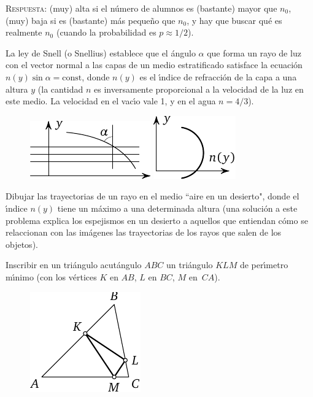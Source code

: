 \documentclass[12pt]{article}  %
\begin{document}
\medskip
\textsc{Respuesta:} (muy) alta si el n\'umero de alumnos es (bastante) mayor que $n_0$,
(muy) baja si es (bastante) m\'as peque\~no que $n_0$, y hay que buscar qu\'e es realmente $n_0$ (cuando la probabilidad es $p \approx 1/2$).

\bigskip
{} La ley de Snell (o Snellius) establece que el \'angulo $\alpha$ que forma un rayo de luz con el vector normal a las capas de un medio estratificado satisface la ecuaci\'on $n(y) \sin \alpha=\text{const}$,
donde $n(y)$ es el \'{\i}ndice de refracci\'on de la capa a una altura $y$ (la cantidad $n$ es 
inversamente proporcional a la velocidad 
de la luz en este medio. La velocidad en el vac\'{\i}o vale 1, y en el agua $n=4/3$).
\begin{figure}[h]
\centering
\includegraphics{taskbook-47}\hskip2cm
\includegraphics{taskbook-471}
\end{figure}

Dibujar las trayectorias de un rayo en el medio ``aire en un desierto", donde el \'{\i}ndice $n(y)$ tiene un m\'aximo 
a una determinada altura
(una soluci\'on a este problema explica los espejismos en un desierto a aquellos que entiendan c\'omo se relaccionan con las im\'agenes las trayectorias de los rayos que salen de los objetos).

\bigskip
{} Inscribir en un tri\'angulo acut\'angulo $ABC$ un tri\'angulo $KLM$ de per\'{\i}metro m\'{\i}nimo
(con los v\'ertices $K$ en $AB$, $L$ en $BC$, $M$ en~$CA$).
\begin{figure}[h]
\centering
\includegraphics{taskbook-48} 
\end{figure}
\end{document}

